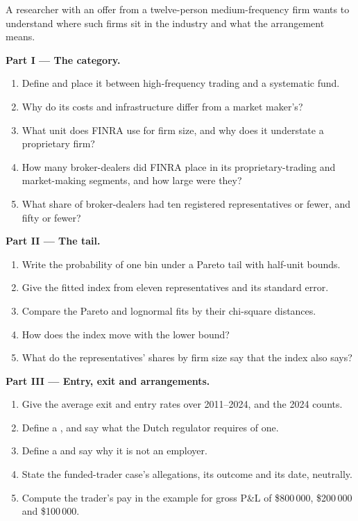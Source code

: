 \begin{problem}\label{pb:in:medium-frequency-proprietary-shops:1}
A researcher with an offer from a twelve-person medium-frequency firm wants to understand where such firms sit in the
industry and what the arrangement means.

\medskip\noindent\textbf{Part I --- The category.}
\begin{enumerate}
\item Define  and place it between high-frequency trading and a systematic fund.
\item Why do its costs and infrastructure differ from a market maker's?
\item What unit does FINRA use for firm size, and why does it understate a proprietary firm?
\item How many broker-dealers did FINRA place in its proprietary-trading and market-making segments, and how large were they?
\item What share of broker-dealers had ten registered representatives or fewer, and fifty or fewer?
\end{enumerate}

\medskip\noindent\textbf{Part II --- The tail.}
\begin{enumerate}[resume]
\item Write the probability of one bin under a Pareto tail with half-unit bounds.
\item Give the fitted index from eleven representatives and its standard error.
\item Compare the Pareto and lognormal fits by their chi-square distances.
\item How does the index move with the lower bound?
\item What do the representatives' shares by firm size say that the index also says?
\end{enumerate}

\medskip\noindent\textbf{Part III --- Entry, exit and arrangements.}
\begin{enumerate}[resume]
\item Give the average exit and entry rates over 2011--2024, and the 2024 counts.
\item Define a , and say what the Dutch regulator requires of one.
\item Define a  and say why it is not an employer.
\item State the funded-trader case's allegations, its outcome and its date, neutrally.
\item Compute the trader's pay in the example for gross P\&L of \$800\,000, \$200\,000 and \$100\,000.
\end{enumerate}


\end{problem}
